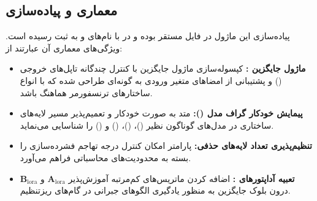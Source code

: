 \subsection{معماری و پیاده‌سازی}
پیاده‌سازی این ماژول در فایل  مستقر بوده و در  با نام‌های  و  به ثبت رسیده است. ویژگی‌های معماری آن عبارتند از:
\begin{itemize}
    \item \textbf{ماژول جایگزین :} کپسوله‌سازی ماژول جایگزین با کنترل چندگانه تاپل‌های خروجی () و پشتیبانی از امضاهای متغیر ورودی به گونه‌ای طراحی شده که با انواع ساختارهای ترنسفورمر هماهنگ باشد.
    \item \textbf{پیمایش خودکار گراف مدل ():} متد  به صورت خودکار و تعمیم‌پذیر مسیر لایه‌های ساختاری در مدل‌های گوناگون نظیر  ()،  ()،  () و  () را شناسایی می‌نماید.
    \item \textbf{تنظیم‌پذیری تعداد لایه‌های حذفی:} پارامتر  امکان کنترل درجه تهاجم فشرده‌سازی را بسته به محدودیت‌های محاسباتی فراهم می‌آورد.
    \item \textbf{تعبیه آداپتورهای :} اضافه کردن ماتریس‌های کم‌مرتبه آموزش‌پذیر $\mathbf{A}_{\text{lora}}$ و $\mathbf{B}_{\text{lora}}$ درون بلوک جایگزین به منظور یادگیری الگوهای جبرانی در گام‌های ریزتنظیم.
\end{itemize}
